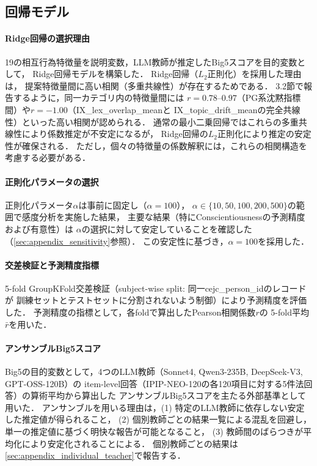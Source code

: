 \documentclass[dvipdfmx,11pt,a4paper]{bxjsarticle}
\begin{document}
\subsection{回帰モデル}
\label{sec:regression}

\paragraph{Ridge回帰の選択理由}
19の相互行為特徴量を説明変数，LLM教師が推定したBig5スコアを目的変数として，
Ridge回帰モデルを構築した．
Ridge回帰（$L_2$正則化）を採用した理由は，
提案特徴量間に高い相関（多重共線性）が存在するためである．
3.2節で報告するように，同一カテゴリ内の特徴量間には
$r = 0.78$--$0.97$（PG系沈黙指標間）や$r = -1.00$（IX\_lex\_overlap\_meanと
IX\_topic\_drift\_meanの完全共線性）といった高い相関が認められる．
通常の最小二乗回帰ではこれらの多重共線性により係数推定が不安定になるが，
Ridge回帰の$L_2$正則化により推定の安定性が確保される．
ただし，個々の特徴量の係数解釈には，これらの相関構造を考慮する必要がある．

\paragraph{正則化パラメータの選択}
正則化パラメータ$\alpha$は事前に固定し（$\alpha = 100$），
$\alpha \in \{10, 50, 100, 200, 500\}$の範囲で感度分析を実施した結果，
主要な結果（特にConscientiousnessの予測精度および有意性）は
$\alpha$の選択に対して安定していることを確認した（\ref{sec:appendix_sensitivity}参照）．
この安定性に基づき，$\alpha = 100$を採用した．

\paragraph{交差検証と予測精度指標}
5-fold GroupKFold交差検証（subject-wise split: 同一cejc\_person\_idのレコードが
訓練セットとテストセットに分割されないよう制御）により予測精度を評価した．
予測精度の指標として，各foldで算出したPearson相関係数$r$の
5-fold平均$\bar{r}$を用いた．

\paragraph{アンサンブルBig5スコア}
Big5の目的変数として，4つのLLM教師（Sonnet4, Qwen3-235B, DeepSeek-V3, GPT-OSS-120B）の
item-level回答（IPIP-NEO-120の各120項目に対する5件法回答）の算術平均から算出した
アンサンブルBig5スコアを主たる外部基準として用いた．
アンサンブルを用いる理由は，(1) 特定のLLM教師に依存しない安定した推定値が得られること，
(2) 個別教師ごとの結果一覧による混乱を回避し，単一の推定値に基づく明快な報告が可能となること，
(3) 教師間のばらつきが平均化により安定化されることによる．
個別教師ごとの結果は\ref{sec:appendix_individual_teacher}で報告する．
\end{document}
